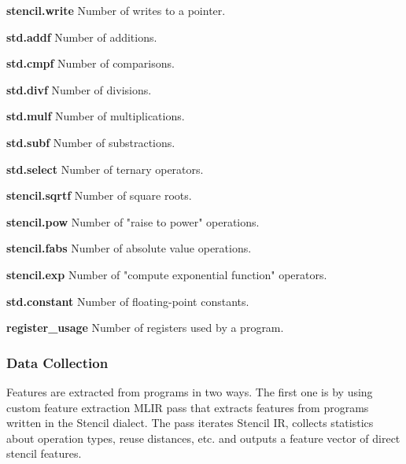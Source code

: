 \documentclass[sigplan,\review anonymous]{acmart}
\begin{document}
\begin{description}
  \item \textbf{stencil.write} Number of writes to a pointer.
  \item \textbf{std.addf} Number of additions.
  \item \textbf{std.cmpf} Number of comparisons.
  \item \textbf{std.divf} Number of divisions.
  \item \textbf{std.mulf} Number of multiplications.
  \item \textbf{std.subf} Number of substractions.
  \item \textbf{std.select} Number of ternary operators.
  \item \textbf{stencil.sqrtf} Number of square roots.
  \item \textbf{stencil.pow} Number of "raise to power" operations.
  \item \textbf{stencil.fabs} Number of absolute value operations.
  \item \textbf{stencil.exp} Number of "compute exponential function"
  operators. 
  \item \textbf{std.constant} Number of floating-point constants.
  \item \textbf{register\_usage} Number of registers used by a program.
\end{description}


\subsubsection{Data Collection}

Features are extracted from programs in two ways. The first one is by using
custom feature extraction MLIR pass that extracts features from programs
written in the Stencil dialect. The pass iterates Stencil IR, collects
statistics about operation types, reuse distances, etc. and outputs a feature
vector of direct stencil features.
\end{document}
